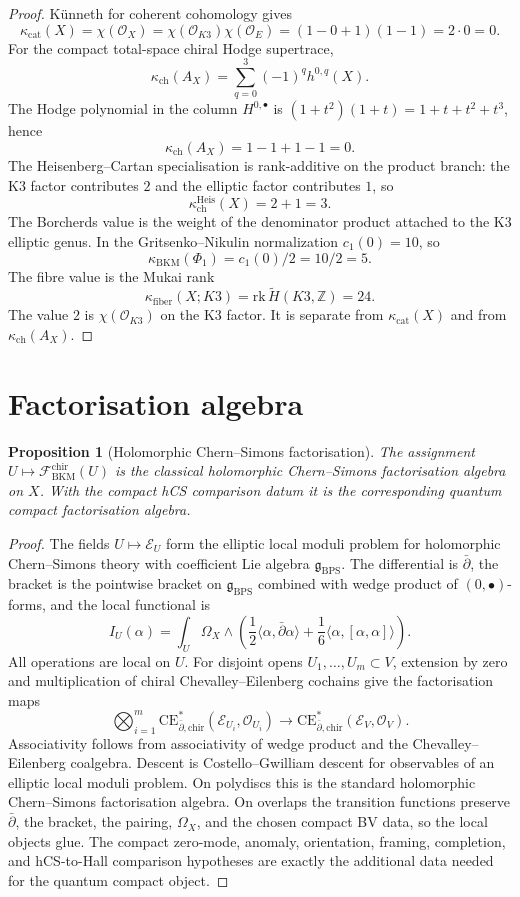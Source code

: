 \documentclass[11pt]{amsart}
\providecommand{\Z}{\mathbb{Z}}
\providecommand{\dbar}{\bar{\partial}}
\providecommand{\gBPS}{\mathfrak{g}_{\mathrm{BPS}}}
\providecommand{\CE}{\mathrm{CE}}
\providecommand{\chir}{\mathrm{chir}}
\providecommand{\cE}{\mathcal{E}}
\providecommand{\cF}{\mathcal{F}}
\providecommand{\cO}{\mathcal{O}}
\providecommand{\kch}{\kappa_{\mathrm{ch}}}
\providecommand{\kBKM}{\kappa_{\mathrm{BKM}}}
\providecommand{\kcat}{\kappa_{\mathrm{cat}}}
\providecommand{\kfib}{\kappa_{\mathrm{fiber}}}
\theoremstyle{plain}
\newtheorem{proposition}[theorem]{Proposition}
\theoremstyle{definition}
\theoremstyle{remark}
\begin{document}
\begin{proof}
K\"unneth for coherent cohomology gives
\[
 \kcat(X)=\chi(\cO_X)
 =\chi(\cO_{K3})\chi(\cO_E)
 =(1-0+1)(1-1)=2\cdot 0=0.
\]
For the compact total-space chiral Hodge supertrace,
\[
 \kch(A_X)=\sum_{q=0}^3(-1)^q h^{0,q}(X).
\]
The Hodge polynomial in the column $H^{0,\bullet}$ is
$(1+t^2)(1+t)=1+t+t^2+t^3$, hence
\[
 \kch(A_X)=1-1+1-1=0.
\]
The Heisenberg--Cartan specialisation is rank-additive on the product
branch: the K3 factor contributes $2$ and the elliptic factor
contributes $1$, so
\[
 \kch^{\mathrm{Heis}}(X)=2+1=3.
\]
The Borcherds value is the weight of the denominator product attached
to the K3 elliptic genus. In the Gritsenko--Nikulin normalization
$c_1(0)=10$, so
\[
 \kBKM(\Phi_1)=c_1(0)/2=10/2=5.
\]
The fibre value is the Mukai rank
\[
 \kfib(X;K3)=\mathrm{rk}\,\widetilde H(K3,\Z)=24.
\]
The value $2$ is $\chi(\cO_{K3})$ on the K3 factor. It is separate from
$\kcat(X)$ and from $\kch(A_X)$.
\end{proof}

\section{Factorisation algebra}

\begin{proposition}[Holomorphic Chern--Simons factorisation]\label{prop:hcs-factorization}
The assignment $U\mapsto \cF^{\chir}_{\mathrm{BKM}}(U)$ is the
classical holomorphic Chern--Simons factorisation algebra on $X$. With
the compact hCS comparison datum it is the corresponding quantum compact
factorisation algebra.
\end{proposition}

\begin{proof}
The fields $U\mapsto\cE_U$ form the elliptic local moduli problem for
holomorphic Chern--Simons theory with coefficient Lie algebra $\gBPS$.
The differential is $\dbar$, the bracket is the pointwise bracket on
$\gBPS$ combined with wedge product of $(0,\bullet)$-forms, and the
local functional is
\[
 I_U(\alpha)=\int_U \Omega_X\wedge
 \left(\frac{1}{2}\langle \alpha,\dbar\alpha\rangle
 +\frac{1}{6}\langle \alpha,[\alpha,\alpha]\rangle\right).
\]
All operations are local on $U$. For disjoint opens
$U_1,\ldots,U_m\subset V$, extension by zero and multiplication of
chiral Chevalley--Eilenberg cochains give the factorisation maps
\[
 \bigotimes_{i=1}^m
 \CE^*_{\dbar,\chir}(\cE_{U_i},\cO_{U_i})
 \longrightarrow
 \CE^*_{\dbar,\chir}(\cE_V,\cO_V).
\]
Associativity follows from associativity of wedge product and the
Chevalley--Eilenberg coalgebra. Descent is Costello--Gwilliam descent
for observables of an elliptic local moduli problem. On polydiscs this
is the standard holomorphic Chern--Simons factorisation algebra. On
overlaps the transition functions preserve $\dbar$, the bracket, the
pairing, $\Omega_X$, and the chosen compact BV data, so the local
objects glue. The compact zero-mode, anomaly, orientation, framing,
completion, and hCS-to-Hall comparison hypotheses are exactly the
additional data needed for the quantum compact object.
\end{proof}
\end{document}
